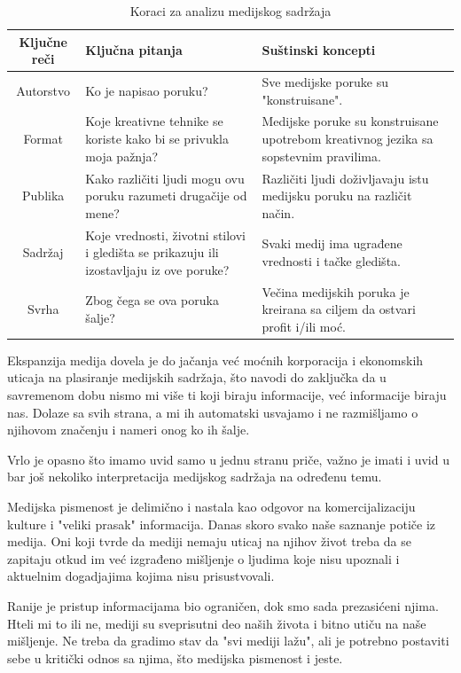 \documentclass[a4paper]{article}
\begin{document}
\begin{table}[ht!]
\begin{center}
\begin{tabular}{|c|p{4cm}|p{3cm} |} \hline
Ključne reči& Ključna pitanja& Suštinski koncepti\\ \hline
Autorstvo&Ko je napisao poruku?&Sve medijske poruke su "konstruisane".\\ \hline
Format &Koje kreativne tehnike se koriste kako bi se privukla moja pažnja?&Medijske poruke su konstruisane upotrebom kreativnog jezika sa sopstevnim pravilima.\\ \hline
Publika &Kako različiti ljudi mogu ovu poruku razumeti drugačije od mene?&Različiti ljudi doživljavaju istu medijsku poruku na različit način.\\ \hline
Sadržaj &Koje vrednosti, životni stilovi i gledišta se prikazuju ili izostavljaju iz ove poruke?&Svaki medij ima ugrađene vrednosti i tačke gledišta.\\ \hline
Svrha &Zbog čega se ova poruka šalje?&Večina medijskih poruka je kreirana sa ciljem da ostvari profit i/ili moć.\\ \hline
\end{tabular}
\caption{Koraci za analizu medijskog sadržaja}
\label{tab:tabela2}
\end{center}
\end{table}

Ekspanzija medija dovela je do jačanja već moćnih korporacija i ekonomskih uticaja na plasiranje medijskih sadržaja, što navodi do zaključka da u savremenom dobu nismo mi više ti koji biraju informacije, već informacije biraju nas. Dolaze sa svih strana, a mi ih automatski usvajamo i ne razmišljamo o njihovom značenju i nameri onog ko ih šalje.

Vrlo je opasno što imamo uvid samo u jednu stranu priče, važno je imati i uvid u bar još nekoliko interpretacija medijskog sadržaja na određenu temu.

Medijska pismenost je delimično i nastala kao odgovor na komercijalizaciju kulture i "veliki prasak" informacija. Danas skoro svako naše saznanje potiče iz medija. Oni koji tvrde da mediji nemaju uticaj na njihov život treba da se zapitaju otkud im već izgrađeno mišljenje o ljudima koje nisu upoznali i aktuelnim dogadjajima kojima nisu prisustvovali.

Ranije je pristup informacijama bio ograničen, dok smo sada prezasićeni njima. Hteli mi to ili ne, mediji su sveprisutni deo naših života i bitno utiču na naše mišljenje. Ne treba da gradimo stav da "svi mediji lažu", ali je potrebno postaviti sebe u kritički odnos sa njima, što medijska pismenost i jeste.
\end{document}

